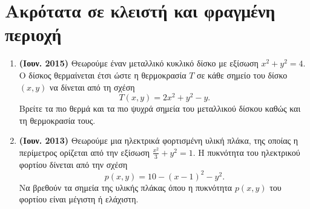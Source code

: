 \section*{Ακρότατα σε κλειστή και φραγμένη περιοχή}

\begin{enumerate}
  \item \textbf{(Ιουν. 2015)} Θεωρούμε έναν μεταλλικό κυκλικό δίσκο με εξίσωση 
    $ x^{2}+y^{2}=4 $. Ο δίσκος θερμαίνεται έτσι ώστε η θερμοκρασία $ T $ σε κάθε 
    σημείο του δίσκο $ (x,y) $ να δίνεται από τη σχέση
    \[
      T(x,y) = 2x^{2}+y^{2}-y.
    \] 
    Βρείτε τα πιο θερμά και τα πιο ψυχρά σημεία του μεταλλικού δίσκου καθώς και τη
    θερμοκρασία τους.

  \item \textbf{(Ιουν. 2013)} Θεωρούμε μια ηλεκτρικά φορτισμένη υλική πλάκα, της οποίας 
    η περίμετρος ορίζεται από την εξίσωση $ \frac{x^{2}}{3} + y^{2} = 1 $. Η 
    πυκνότητα του ηλεκτρικού φορτίου δίνεται από την σχέση
    \[
      p(x,y) = 10 - (x-1)^{2}-y^{2}. 
    \]  
    Να βρεθούν τα σημεία της υλικής πλάκας όπου η πυκνότητα $ p(x,y) $ του φορτίου 
    είναι μέγιστη ή ελάχιστη.
\end{enumerate}


